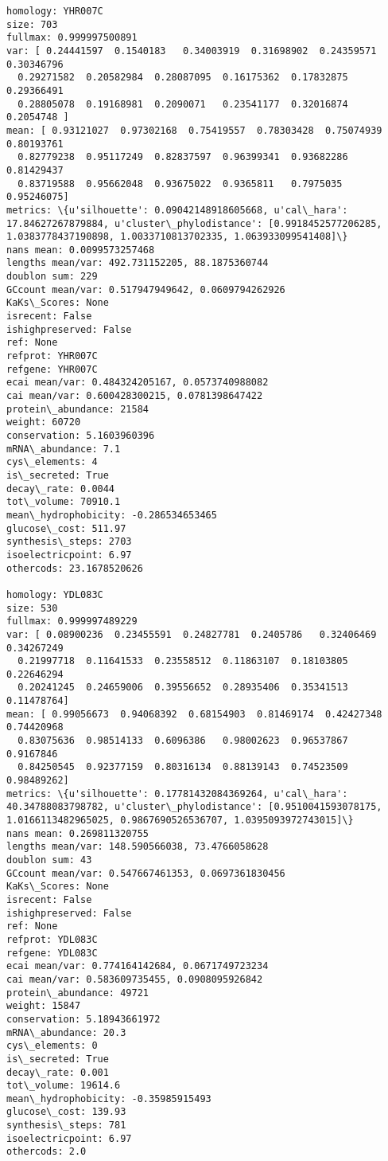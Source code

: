 \documentclass[11pt]{article}
\begin{document}
\begin{Verbatim}[commandchars=\\\{\}]
homology: YHR007C
size: 703
fullmax: 0.999997500891
var: [ 0.24441597  0.1540183   0.34003919  0.31698902  0.24359571  0.30346796
  0.29271582  0.20582984  0.28087095  0.16175362  0.17832875  0.29366491
  0.28805078  0.19168981  0.2090071   0.23541177  0.32016874  0.2054748 ]
mean: [ 0.93121027  0.97302168  0.75419557  0.78303428  0.75074939  0.80193761
  0.82779238  0.95117249  0.82837597  0.96399341  0.93682286  0.81429437
  0.83719588  0.95662048  0.93675022  0.9365811   0.7975035   0.95246075]
metrics: \{u'silhouette': 0.09042148918605668, u'cal\_hara': 17.84627267879884, u'cluster\_phylodistance': [0.9918452577206285, 1.0383778437190898, 1.0033710813702335, 1.063933099541408]\}
nans mean: 0.0099573257468
lengths mean/var: 492.731152205, 88.1875360744
doublon sum: 229
GCcount mean/var: 0.517947949642, 0.0609794262926
KaKs\_Scores: None
isrecent: False
ishighpreserved: False
ref: None
refprot: YHR007C
refgene: YHR007C
ecai mean/var: 0.484324205167, 0.0573740988082
cai mean/var: 0.600428300215, 0.0781398647422
protein\_abundance: 21584
weight: 60720
conservation: 5.1603960396
mRNA\_abundance: 7.1
cys\_elements: 4
is\_secreted: True
decay\_rate: 0.0044
tot\_volume: 70910.1
mean\_hydrophobicity: -0.286534653465
glucose\_cost: 511.97
synthesis\_steps: 2703
isoelectricpoint: 6.97
othercods: 23.1678520626

homology: YDL083C
size: 530
fullmax: 0.999997489229
var: [ 0.08900236  0.23455591  0.24827781  0.2405786   0.32406469  0.34267249
  0.21997718  0.11641533  0.23558512  0.11863107  0.18103805  0.22646294
  0.20241245  0.24659006  0.39556652  0.28935406  0.35341513  0.11478764]
mean: [ 0.99056673  0.94068392  0.68154903  0.81469174  0.42427348  0.74420968
  0.83075636  0.98514133  0.6096386   0.98002623  0.96537867  0.9167846
  0.84250545  0.92377159  0.80316134  0.88139143  0.74523509  0.98489262]
metrics: \{u'silhouette': 0.17781432084369264, u'cal\_hara': 40.34788083798782, u'cluster\_phylodistance': [0.9510041593078175, 1.0166113482965025, 0.9867690526536707, 1.0395093972743015]\}
nans mean: 0.269811320755
lengths mean/var: 148.590566038, 73.4766058628
doublon sum: 43
GCcount mean/var: 0.547667461353, 0.0697361830456
KaKs\_Scores: None
isrecent: False
ishighpreserved: False
ref: None
refprot: YDL083C
refgene: YDL083C
ecai mean/var: 0.774164142684, 0.0671749723234
cai mean/var: 0.583609735455, 0.0908095926842
protein\_abundance: 49721
weight: 15847
conservation: 5.18943661972
mRNA\_abundance: 20.3
cys\_elements: 0
is\_secreted: True
decay\_rate: 0.001
tot\_volume: 19614.6
mean\_hydrophobicity: -0.35985915493
glucose\_cost: 139.93
synthesis\_steps: 781
isoelectricpoint: 6.97
othercods: 2.0


\end{Verbatim}
\end{document}
